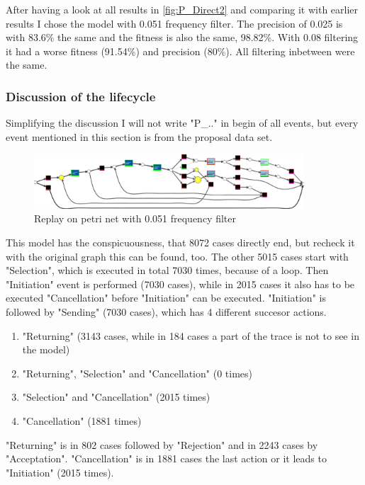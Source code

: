 After having a look at all results in \ref{fig:P_Direct2} and comparing it with earlier results I chose the model with 0.051 frequency filter. The precision of 0.025 is with 83.6\% the same and the fitness is also the same, 98.82\%. With 0.08 filtering it had a worse fitness (91.54\%) and precision (80\%). All filtering inbetween were the same.


\subsubsection{Discussion of the lifecycle}
Simplifying the discussion I will not write "P\_.." in begin of all events, but every event mentioned in this section is from the proposal data set.

\begin{figure}[!htbp]
  \begin{center}
    \includegraphics[width = 0.9\textwidth]{P_ConfomGraph0-051.png}
  \end{center}
  \caption{Replay on petri net with 0.051 frequency filter}
\end{figure}

This model has the conspicuousness, that 8072 cases directly end, but recheck it with the original graph this can be found, too. The other 5015 cases start with "Selection", which is executed in total 7030 times, because of a loop. Then "Initiation" event is performed (7030 cases), while in 2015 cases it also has to be executed "Cancellation" before  "Initiation" can be executed. "Initiation" is followed by "Sending" (7030 cases), which has 4 different succesor actions. 
\begin{enumerate}
	\item "Returning" (3143 cases, while in 184 cases a part of the trace is not to see in the model)
	\item "Returning", "Selection" and "Cancellation" (0 times)
	\item "Selection" and "Cancellation" (2015 times)
	\item "Cancellation"  (1881 times)
\end{enumerate}
"Returning" is in 802 cases followed by "Rejection" and in 2243 cases by "Acceptation". "Cancellation" is in 1881 cases the last action or it leads to "Initiation" (2015 times).


